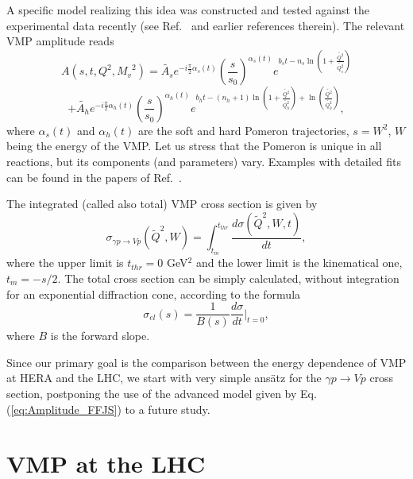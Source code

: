 \documentclass[12pt]{article}
\begin{document}
A specific model realizing this idea was constructed and tested against the experimental data recently (see
Ref.~\cite{FFJS} and earlier references therein). The relevant VMP amplitude reads 
  $$
   A(s,t,Q^2,{M_v}^2)= \widetilde{A_s}e^{-i\frac{\pi}{2}\alpha_s(t)}\left(\frac{s}{s_{0}}\right)^{\alpha_s(t)}
    e^{b_st - n_s\ln{\left(1+\frac{\widetilde{Q^2}}{\widetilde{Q_s^2}}\right)}}
  $$
  \begin{equation}
  +\widetilde{A_h}e^{-i\frac{\pi}{2}\alpha_h(t)}\left(\frac{s}{s_{0}}\right)^{\alpha_h(t)}
    e^{b_ht - (n_h+1)\ln{\left(1+\frac{\widetilde{Q^2}}{\widetilde{Q_h^2}}\right)}
    +\ln{\left(\frac{\widetilde{Q^2}}{\widetilde{Q_h^2}}\right)} },
    \label{eq:Amplitude_FFJS}
    \end{equation}
 where  $\alpha_s(t)$ and $\alpha_h(t)$ are the soft and hard Pomeron trajectories, $s=W^2$, $W$ being the energy of the VMP. Let us 
stress that the Pomeron is unique in all reactions, but its components (and parameters) vary. 
Examples with detailed fits can be found in the papers of Ref.~\cite{FFJS}.

The integrated (called also total) VMP cross section is given by 
\begin{equation}
\sigma_{\gamma p\rightarrow Vp}(\widetilde Q^2, W)=\int_{t_m}^{t_{thr}}\frac{d\sigma(\widetilde Q^2, W, t)}{dt},
\label{total}
\end{equation} 
where the upper limit is $t_{thr} = 0$ GeV$^2$ and the lower limit is the kinematical one, $t_m = -s/2$. The total cross section 
can be simply calculated, without integration for an exponential diffraction cone, according to the formula
\begin{equation}
\sigma_{el}(s)=\frac{1}{B(s)}\frac{d\sigma}{dt}\biggr\rvert_{t=0},
\label{elastic}
\end{equation}
where $B$ is the forward slope. 

Since our primary goal is the comparison between the energy dependence of VMP at HERA and the LHC, we start with very simple ans\"atz for the $\gamma p\rightarrow Vp$ cross section, postponing the use of the advanced model given by  
Eq. (\ref{eq:Amplitude_FFJS}) to a future study.

\section{VMP at the LHC} 
\end{document}
